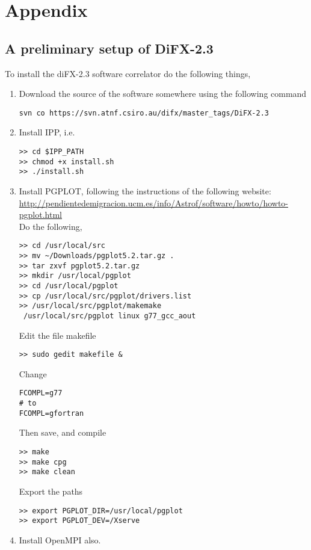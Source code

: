 \section{Appendix }
\subsection{A preliminary setup of DiFX-2.3}

To install the diFX-2.3 software correlator do the following things,
\begin{enumerate}
\item Download the source of the software somewhere using the following command
\begin{verbatim}
svn co https://svn.atnf.csiro.au/difx/master_tags/DiFX-2.3
\end{verbatim}

\item Install IPP, i.e.
\begin{verbatim}
>> cd $IPP_PATH
>> chmod +x install.sh
>> ./install.sh
\end{verbatim}

\item Install PGPLOT, following the instructions of the following website:\\
\url{http://pendientedemigracion.ucm.es/info/Astrof/software/howto/howto-pgplot.html}\\
Do the following,
\begin{verbatim}
>> cd /usr/local/src
>> mv ~/Downloads/pgplot5.2.tar.gz .
>> tar zxvf pgplot5.2.tar.gz
>> mkdir /usr/local/pgplot
>> cd /usr/local/pgplot
>> cp /usr/local/src/pgplot/drivers.list 
>> /usr/local/src/pgplot/makemake
 /usr/local/src/pgplot linux g77_gcc_aout
\end{verbatim}

Edit the file makefile
\begin{verbatim}
>> sudo gedit makefile &
\end{verbatim}
Change
\begin{verbatim}
FCOMPL=g77
# to 
FCOMPL=gfortran
\end{verbatim}
Then save, and compile
\begin{verbatim}
>> make
>> make cpg
>> make clean
\end{verbatim}
Export the paths
\begin{verbatim}
>> export PGPLOT_DIR=/usr/local/pgplot
>> export PGPLOT_DEV=/Xserve
\end{verbatim}

\item Install OpenMPI also.


\end{enumerate}
